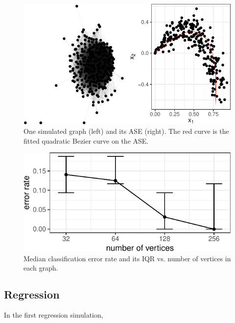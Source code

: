 \documentclass[12pt]{article}
\begin{document}
\begin{figure}[H]

{\centering \includegraphics{draft_files/figure-latex/class-sim-ase-1} 

}

\caption{One simulated graph (left) and its ASE (right). The red curve is the fitted quadratic Bezier curve on the ASE.}\label{fig:class-sim-ase}
\end{figure}

\begin{figure}[H]

{\centering \includegraphics{draft_files/figure-latex/classification-sim-1} 

}

\caption{Median classification error rate and its IQR vs. number of vertices in each graph.}\label{fig:classification-sim}
\end{figure}

\subsection{Regression}\label{regression-1}

In the first regression simulation,
\end{document}
